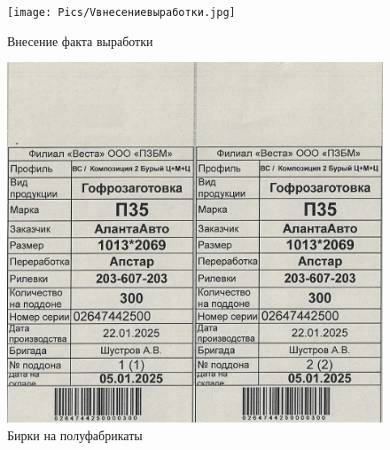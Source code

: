 \begin{figure}
\begin{center}
 \texttt{[image: Pics/Vвнесениевыработки.jpg]}
\end{center}
 \caption{Внесение факта выработки}
 \label{pic:Vвнесениевыработки}
\end{figure}

\begin{figure}
\begin{center}
 \includegraphics[height=0.6\textheight, keepaspectratio]{Pics/V.10.jpg}
\end{center}
 \caption{Бирки на полуфабрикаты}
 \label{pic:V.10}
\end{figure}

